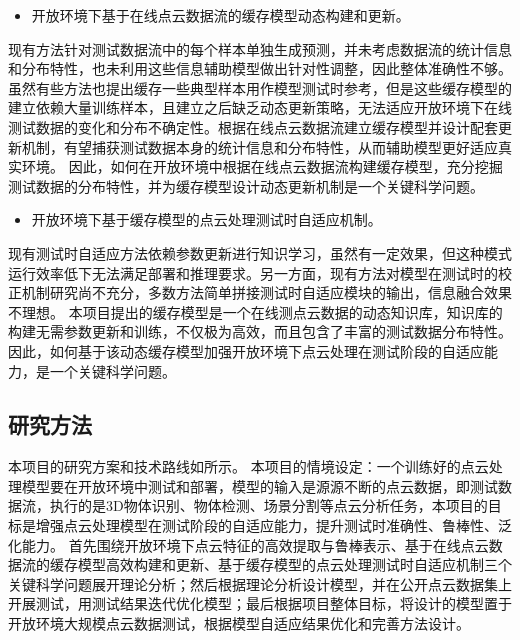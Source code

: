 \documentclass[12pt]{article}
\begin{document}
\begin{itemize}
    \item 开放环境下基于在线点云数据流的缓存模型动态构建和更新。
\end{itemize}
现有方法针对测试数据流中的每个样本单独生成预测，并未考虑数据流的统计信息和分布特性，也未利用这些信息辅助模型做出针对性调整，因此整体准确性不够。
虽然有些方法也提出缓存一些典型样本用作模型测试时参考，但是这些缓存模型的建立依赖大量训练样本，且建立之后缺乏动态更新策略，无法适应开放环境下在线测试数据的变化和分布不确定性。根据在线点云数据流建立缓存模型并设计配套更新机制，有望捕获测试数据本身的统计信息和分布特性，从而辅助模型更好适应真实环境。
因此，如何在开放环境中根据在线点云数据流构建缓存模型，充分挖掘测试数据的分布特性，并为缓存模型设计动态更新机制是一个关键科学问题。

\begin{itemize}
    \item 开放环境下基于缓存模型的点云处理测试时自适应机制。
\end{itemize}
现有测试时自适应方法依赖参数更新进行知识学习，虽然有一定效果，但这种模式运行效率低下无法满足部署和推理要求。另一方面，现有方法对模型在测试时的校正机制研究尚不充分，多数方法简单拼接测试时自适应模块的输出，信息融合效果不理想。
本项目提出的缓存模型是一个在线测点云数据的动态知识库，知识库的构建无需参数更新和训练，不仅极为高效，而且包含了丰富的测试数据分布特性。因此，如何基于该动态缓存模型加强开放环境下点云处理在测试阶段的自适应能力，是一个关键科学问题。


\subsection{研究方法}
本项目的研究方案和技术路线如所示。
本项目的情境设定：一个训练好的点云处理模型要在开放环境中测试和部署，模型的输入是源源不断的点云数据，即测试数据流，执行的是3D物体识别、物体检测、场景分割等点云分析任务，本项目的目标是增强点云处理模型在测试阶段的自适应能力，提升测试时准确性、鲁棒性、泛化能力。
首先围绕开放环境下点云特征的高效提取与鲁棒表示、基于在线点云数据流的缓存模型高效构建和更新、基于缓存模型的点云处理测试时自适应机制三个关键科学问题展开理论分析；然后根据理论分析设计模型，并在公开点云数据集上开展测试，用测试结果迭代优化模型；最后根据项目整体目标，将设计的模型置于开放环境大规模点云数据测试，根据模型自适应结果优化和完善方法设计。
\end{document}
